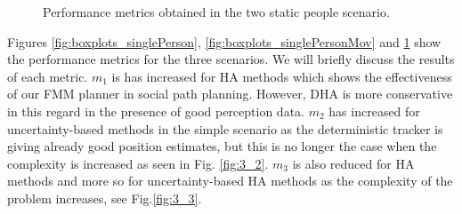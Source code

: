 \begin{figure}[t!]
%
%
%

\caption{Performance metrics obtained in the two static people scenario.
}
\label{fig:boxplots_2people}
\end{figure}


Figures \ref{fig:boxplots_singlePerson}, \ref{fig:boxplots_singlePersonMov} and \ref{fig:boxplots_2people} show the performance metrics for the three scenarios. We will briefly discuss the results of each metric. $m_{1}$ is has increased for HA methods which shows the effectiveness of our FMM planner in social path planning. However, DHA is more conservative in this regard in the presence of good perception data. $m_{2}$ has increased for uncertainty-based methods in the simple scenario as the deterministic tracker is giving already good position estimates, but this is no longer the case when the complexity is increased as seen in Fig. \ref{fig:3_2}. $m_{3}$ is also reduced for HA methods and more so for uncertainty-based HA methods as the complexity of the problem increases, see Fig.\ref {fig:3_3}.


